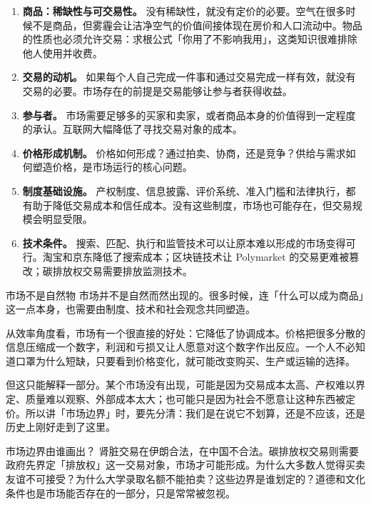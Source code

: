 \documentclass[10pt,a4paper]{ctexart}
\begin{document}
\begin{enumerate}
  \item \textbf{商品：稀缺性与可交易性。} 没有稀缺性，就没有定价的必要。空气在很多时候不是商品，但雾霾会让洁净空气的价值间接体现在房价和人口流动中。物品的性质也必须允许交易：求根公式「你用了不影响我用」，这类知识很难排除他人使用并收费。
  \item \textbf{交易的动机。} 如果每个人自己完成一件事和通过交易完成一样有效，就没有交易的必要。市场存在的前提是交易能够让参与者获得收益。
  \item \textbf{参与者。} 市场需要足够多的买家和卖家，或者商品本身的价值得到一定程度的承认。互联网大幅降低了寻找交易对象的成本。
  \item \textbf{价格形成机制。} 价格如何形成？通过拍卖、协商，还是竞争？供给与需求如何塑造价格，是市场运行的核心问题。
  \item \textbf{制度基础设施。} 产权制度、信息披露、评价系统、准入门槛和法律执行，都有助于降低交易成本和信任成本。没有这些制度，市场也可能存在，但交易规模会明显受限。
  \item \textbf{技术条件。} 搜索、匹配、执行和监管技术可以让原本难以形成的市场变得可行。淘宝和京东降低了搜索成本；区块链技术让 Polymarket 的交易更难被篡改；碳排放权交易需要排放监测技术。
\end{enumerate}

\begin{insightbox}{市场不是自然物}
市场并不是自然而然出现的。很多时候，连「什么可以成为商品」这一点本身，也需要由制度、技术和社会观念共同塑造。

从效率角度看，市场有一个很直接的好处：它降低了协调成本。价格把很多分散的信息压缩成一个数字，利润和亏损又让人愿意对这个数字作出反应。一个人不必知道口罩为什么短缺，只要看到价格变化，就可能改变购买、生产或运输的选择。

但这只能解释一部分。某个市场没有出现，可能是因为交易成本太高、产权难以界定、质量难以观察、外部成本太大；也可能只是因为社会不愿意让这种东西被定价。所以讲「市场边界」时，要先分清：我们是在说它不划算，还是不应该，还是历史上刚好走到了这里。
\end{insightbox}

\begin{conceptbox}{市场边界由谁画出？}
肾脏交易在伊朗合法，在中国不合法。碳排放权交易则需要政府先界定「排放权」这一交易对象，市场才可能形成。为什么大多数人觉得买卖友谊不可接受？为什么大学录取名额不能拍卖？这些边界是谁划定的？道德和文化条件也是市场能否存在的一部分，只是常常被忽视。
\end{conceptbox}
\end{document}
